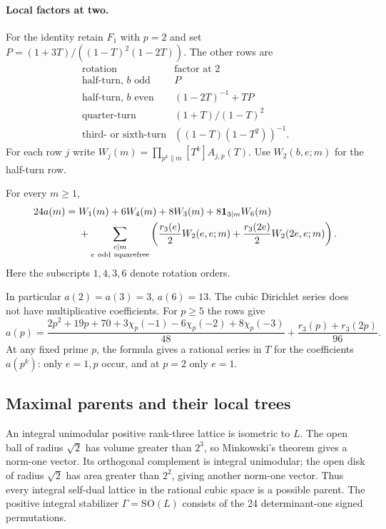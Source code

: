 \paragraph{Local factors at two.}
For the identity retain $F_1$ with $p=2$ and set
$P=(1+3T)/((1-T)^2(1-2T))$. The other rows are
\[
\begin{array}{c|c}
 \text{rotation}&\text{factor at }2\\ \hline
 \text{half-turn, }b\text{ odd}&P\\
 \text{half-turn, }b\text{ even}&(1-2T)^{-1}+TP\\
 \text{quarter-turn}&(1+T)/(1-T)^2\\
 \text{third- or sixth-turn}&((1-T)(1-T^2))^{-1}.
\end{array}
\]
For each row $j$ write $W_j(m)=\prod_{p^k\parallel m}[T^k]A_{j,p}(T)$.
Use $W_2(b,e;m)$ for the half-turn row.
\begin{theorem}\label{thm:cubic-all}
For every $m\ge1$,
\[
\begin{split}
24a(m)={}&W_1(m)+6W_4(m)+8W_3(m)
  +8\mathbf1_{3\mid m}W_6(m)\\
 &+\sum_{\substack{e\mid m\\e\ {\rm odd\ squarefree}}}
  \left(\frac{r_3(e)}2W_2(e,e;m)
       +\frac{r_3(2e)}2W_2(2e,e;m)\right).
\end{split}
\]
Here the subscripts $1,4,3,6$ denote rotation orders.
\end{theorem}
In particular $a(2)=a(3)=3$, $a(6)=13$. The cubic Dirichlet series
does not have multiplicative coefficients. For $p\ge5$ the rows give
\[
 a(p)=\frac{2p^2+19p+70+3\chi_p(-1)-6\chi_p(-2)+8\chi_p(-3)}{48}
       +\frac{r_3(p)+r_3(2p)}{96}.
\]
At any fixed prime $p$, the formula gives a rational series in $T$
for the coefficients $a(p^k)$: only $e=1,p$ occur, and at $p=2$
only $e=1$.

\subsection*{Maximal parents and their local trees}
An integral unimodular positive rank-three lattice is isometric to $L$.
The open ball of radius $\sqrt2$ has volume greater than $2^3$,
so Minkowski's theorem gives a norm-one vector. Its orthogonal complement
is integral unimodular; the open disk of radius $\sqrt2$ has area greater
than $2^2$, giving another norm-one vector. Thus every integral self-dual
lattice in the rational cubic space is a possible parent. The positive
integral stabilizer $\Gamma=\mathrm{SO}(L)$ consists of the 24 determinant-one
signed permutations.

